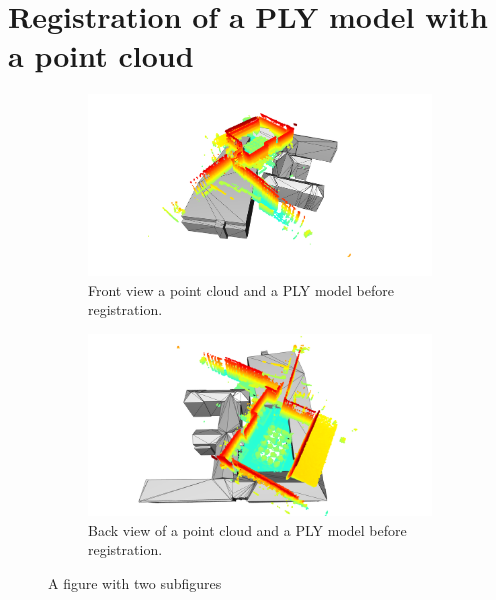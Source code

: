     \section{Registration of a PLY model with a point cloud}
        \begin{figure}[H]
            \centering
            \begin{subfigure}{1\textwidth}
                \centering
                \includegraphics[scale=0.2]{images/solution_images/initial_ply_a.png}
                \caption{Front view a point cloud and a PLY model before registration.}
                \label{fig:intial_ply_a}
            \end{subfigure}
            \hfill
            \begin{subfigure}{1\textwidth}
                \centering
                \includegraphics[scale=0.2]{images/solution_images/initial_ply_b.png}
                \caption{Back view of a point cloud and a PLY model before registration.}
                \label{fig:intial_ply_b}
            \end{subfigure}
            \caption{A figure with two subfigures}
            \label{fig:initial_ply}
        \end{figure}

